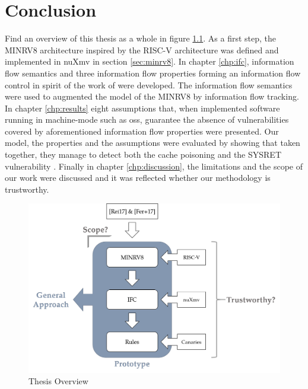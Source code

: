 
\chapter{Conclusion}
\label{chp:conclusion}

Find an overview of this thesis as a whole in figure \ref{fig:overview}.
As a first step, the MINRV8 architecture inspired by the RISC-V architecture was defined and implemented in nuXmv in section \ref{sec:minrv8}.
In chapter \ref{chp:ifc}, information flow semantics and three information flow properties forming an information flow control in spirit of the work of \citeauthor{Ferraiuolo17} \cite{Ferraiuolo17} were developed.
The information flow semantics were used to augmented the model of the MINRV8 by information flow tracking.
In chapter \ref{chp:results} eight assumptions that, when implemented software running in machine-mode such as \glspl{os}, guarantee the absence of vulnerabilities covered by aforementioned information flow properties were presented.
Our model, the properties and the assumptions were evaluated by showing that taken together, they manage to detect both the cache poisoning \cite{Wojtczuk09} and the SYSRET vulnerability \cite{Dunlap19}.
Finally in chapter \ref{chp:discussion}, the limitations and the scope of our work were discussed and it was reflected whether our methodology is trustworthy.

\begin{figure}
    \centering
    \includegraphics[width=\textwidth]{figures/thesis-overview.png}
    \caption{Thesis Overview}
    \label{fig:overview}
\end{figure}

